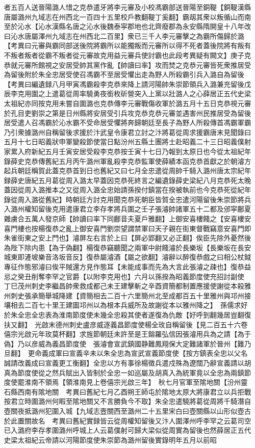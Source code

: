 者五百人送晉陽潞人惜之克恭遣牙將李元審及小校馮霸部送晉陽至銅鞮【銅鞮漢縣唐屬潞州九域志在州西北一百四十五里校戶教翻鞮丁奚翻】霸刼其衆以叛循山而南至於沁水【沁水漢縣名唐之沁水後魏泰寜郡地也北齊廢郡為永安縣隋開皇十八年改曰沁水唐屬澤州九域志在州西北二百里】衆已三千人李元審擊之為霸所傷歸於潞【考異曰元審與霸同部送後院將霸所以能獨叛而元審所以得不死者蓋後院將有叛有不叛者叛者從霸不叛者從元審故克用益元審兵使討霸也此段考異疑有闕文】庚子克恭就元審所館視之安居受帥其黨作亂【帥讀曰率】攻而焚之克恭元審皆死衆推居受為留後附於朱全忠居受使召馮霸不至居受懼出走為野人所殺霸引兵入潞自為留後　【考異曰編遺録八月甲寅馮霸殺李克恭來降上請河陽帥朱崇節領兵入潞兼充留後戊辰李克用圍之上遣葛從周率驍勇夜銜枚斫營突入上黨以壯潞人之心薛居正五代史梁太祖紀亦同按克用未嘗自圍潞也克恭傳李元審戰傷收軍於潞五月十五日克恭視元審於孔目吏劉崇之第是日州縣將安居受引兵攻克恭克恭元審並遇害州民推居受為留後居受遣人召馮霸於沁水霸不受命居受懼將奔歸朝廷至長子為野人所殺傳首馮霸軍霸乃引衆據潞州自稱留後求援於汴武皇令康君立討之汴將葛從周求援霸唐末見聞錄曰五月十七日昭義狀申軍變殺節使當日點汾州五縣土團將士赴昭義二十三日昭義僕射家累入府新紀五月壬寅安居受殺李克恭按壬寅十七日乃報到太原日也今從太祖紀年錄薛史克恭傳舊紀五月丙午潞州軍亂殺李克恭監軍使薛績本函克恭首獻之於朝濬方起兵朝廷稱賀此蓋克恭首到日也舊紀又曰七月全忠遣從周帥千騎入潞州唐太宗紀年録薛史唐紀五月葛從周入潞太早蓋因克恭死終言之編遺錄薛史梁紀八月克恭死太晚蓋因從周入潞推本之又從周入潞全忠始請孫揆付鎮當在揆被執前也今克恭死從紀年錄從周入潞從舊紀】時朝廷方討克用聞克恭死朝臣皆賀全忠遣河陽留後朱崇節將兵入潞州權知留後克用遣康君立李存孝將兵圍之壬子張濬帥諸軍五十二都及邠寜鄜夏雜虜合五萬人發京師【帥讀曰率下同鄜音夫夏戶雅翻】上御安喜樓餞之【安喜樓安喜門樓也按楊復恭之亂上御安喜門劉崇望謂禁軍曰天子親在街東督戰竊意安喜門即朱雀街東之安上門也】濬屏左右言於上曰【屏必郢翻又必正翻】俟臣先除外憂然後為陛下除内患【為于偽翻】楊復恭竊聽聞之兩軍中尉餞濬於長樂坂【長樂坂在長安城東即滻坡樂音洛坂音反】復恭屬濬酒【屬之欲翻】濬辭以醉復恭戲之曰相公杖鉞專征作態邪濬曰俟平賊還方見作態耳【未能成事而先為大言此張濬之疎也】復恭益忌之癸丑削奪李罕之官爵【以附李克用也】六月以孫揆為昭義節度使充招討副使　丁巳茂州刺史李繼昌帥衆救成都己未王建擊斬之辛酉資簡都制置應援使謝從本殺雅州刺史張承簡舉城降建【資簡相去二百十六里簡州北至成都百五十里雅州與邛州接壤相去二百七十里王建圖邛州以為根本兵威所及故謝從本以雅州降之】　孫儒求好於朱全忠全忠表為淮南節度使未幾全忠殺其使者遂復為仇敵【好呼到翻幾居豈翻復扶又翻】　光啟末德州刺史盧彦威逐義昌節度使楊全玫自稱留後【見二百五十六卷僖宗光啟元年玫莫杯翻】求旌節朝廷未許至是王鎔羅弘信因張濬用兵為之請【為于偽】乃以彦威為義昌節度使　張濬會宣武鎮國静難鳳翔保大定難諸軍於晉州【難乃旦翻】　更命義成軍曰宣義辛未以朱全忠為宣武宣義節度使【按方鎮表全忠以父名誠請改義成曰宣義更工衡翻】全忠以方有事徐楊徵兵遣戍殊為遼闊乃辭宣義請以胡真為節度使從之然兵賦出入皆制於全忠一如巡屬及胡真入為統軍竟以全忠為兩鎮節度使罷淮南不領焉【領淮南見上卷僖宗光啟三年】　秋七月官軍至隂地關【汾州靈石縣西南有隂地關　考異曰舊紀七月乙酉朔王師屯於隂地太原大將康君立以兵拒戰按君立時圍潞州何暇至隂地關又不言勝負今不取】朱全忠遣驍將葛從周將千騎潛自壺關夜抵潞州犯圍入城【九域志壼關西至潞州二十五里宋白曰壺關縣以山形似壺古於此置關故名　考異曰舊紀實録皆云從周權知留後又汴人圍澤州呼李罕之云葛司空已入潞府李存孝圍潞州呼城上人云葛僕射可歸大梁似從周實為留後也然薛居正五代史梁太祖紀云帝請以河陽節度使朱崇節為潞州留後實錄明年五月以前昭